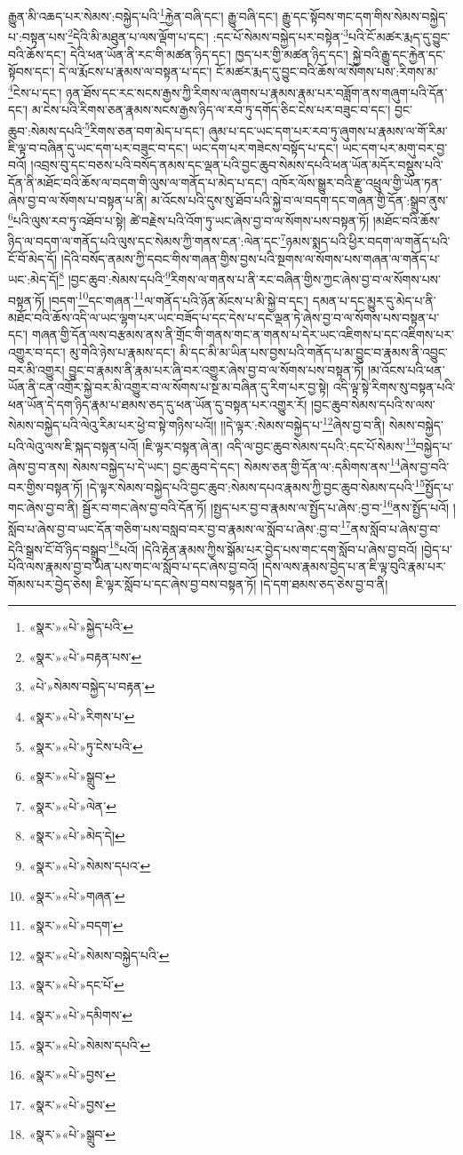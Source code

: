 རྒྱུན་མི་འཆད་པར་སེམས་:བསྐྱེད་པའི་\footnote{«སྣར་»«པེ་»སྐྱེད་པའི་}རྐྱེན་བཞི་དང་། རྒྱུ་བཞི་དང་། རྒྱུ་དང་སྟོབས་གང་དག་གིས་སེམས་བསྐྱེད་པ་:བསྟན་པས་\footnote{«སྣར་»«པེ་»བརྟན་པས་}དེའི་མི་མཐུན་པ་ལས་ལྡོག་པ་དང་། :དང་པོ་སེམས་བསྐྱེད་པར་བསྟེན་\footnote{«པེ་»སེམས་བསྐྱེད་པ་བརྟན་}པའི་ངོ་མཚར་རྨད་དུ་བྱུང་བའི་ཆོས་དང་། དེའི་ཕན་ཡོན་ནི་རང་གི་མཚན་ཉིད་དང་། ཁྱད་པར་གྱི་མཚན་ཉིད་དང་། སྐྱེ་བའི་རྒྱུ་དང་རྐྱེན་དང་སྟོབས་དང་། དེ་ལ་རྨོངས་པ་རྣམས་ལ་བསྟན་པ་དང་། ངོ་མཚར་རྨད་དུ་བྱུང་བའི་ཆོས་ལ་སོགས་པས་:རིགས་མ་\footnote{«སྣར་»«པེ་»རིགས་པ་}ངེས་པ་དང་། ཉན་ཐོས་དང་རང་སངས་རྒྱས་ཀྱི་རིགས་ལ་ཞུགས་པ་རྣམས་རྣམ་པར་བཟློག་ནས་གཞུག་པའི་དོན་དང་། མ་ངེས་པའི་རིགས་ཅན་རྣམས་སངས་རྒྱས་ཉིད་ལ་རབ་ཏུ་དགོད་ཅིང་ངེས་པར་བཟུང་བ་དང་། བྱང་ཆུབ་:སེམས་དཔའི་\footnote{«སྣར་»«པེ་»ཏུ་ངེས་པའི་}རིགས་ཅན་བག་མེད་པ་དང་། ཞུམ་པ་དང་ཡང་དག་པར་རབ་ཏུ་ཞུགས་པ་རྣམས་ལ་གོ་རིམ་ཇི་ལྟ་བ་བཞིན་དུ་ཡང་དག་པར་བཟུང་བ་དང་། ཡང་དག་པར་གཟེངས་བསྟོད་པ་དང་། ཡང་དག་པར་མགུ་བར་བྱ་བའོ། །འབྲས་བུ་དང་བཅས་པའི་བསོད་ནམས་དང་ལྡན་པའི་བྱང་ཆུབ་སེམས་དཔའི་ཕན་ཡོན་མདོར་བསྡུས་པའི་དོན་ནི་མཐོང་བའི་ཆོས་ལ་བདག་གི་ལུས་ལ་གནོད་པ་མེད་པ་དང་། འཁོར་ལོས་སྒྱུར་བའི་རྫུ་འཕྲུལ་གྱི་ཡོན་ཏན་ཞེས་བྱ་བ་ལ་སོགས་པ་བསྟན་པ་ནི། མ་འོངས་པའི་དུས་སུ་ཐོབ་པའི་སྐྱེ་བ་ལ་བདག་དང་གཞན་གྱི་དོན་:སྒྲུབ་ནུས་\footnote{«སྣར་»«པེ་»སྒྲུབ་}པའི་ལུས་རབ་ཏུ་འཐོབ་པ་སྟེ། ཚེ་བརྗེས་པའི་འོག་ཏུ་ཡང་ཞེས་བྱ་བ་ལ་སོགས་པས་བསྟན་ཏོ། །མཐོང་བའི་ཆོས་ཉིད་ལ་བདག་ལ་གནོད་པའི་ལུས་དང་སེམས་ཀྱི་གནས་ངན་:ལེན་དང་\footnote{«སྣར་»«པེ་»ལེན་}ཉམས་སྨད་པའི་ཕྱིར་བདག་ལ་གནོད་པའི་ངོ་བོ་མེད་དོ། །དེའི་བསོད་ནམས་ཀྱི་དབང་གིས་གཞན་གྱིས་བྱས་པའི་སྔགས་ལ་སོགས་པས་གཞན་ལ་གནོད་པ་ཡང་:མེད་དོ།\footnote{«སྣར་»«པེ་»མེད་དེ།} །བྱང་ཆུབ་:སེམས་དཔའི་\footnote{«སྣར་»«པེ་»སེམས་དཔའ་}རིགས་ལ་གནས་པ་ནི་རང་བཞིན་གྱིས་ཀྱང་ཞེས་བྱ་བ་ལ་སོགས་པས་བསྟན་ཏོ། །བདག་\footnote{«སྣར་»«པེ་»གཞན་}དང་གཞན་\footnote{«སྣར་»«པེ་»བདག་}ལ་གནོད་པའི་ཉོན་མོངས་པ་མི་སྐྱེ་བ་དང་། དམན་པ་དང་མྱུར་དུ་མེད་པ་ནི་མཐོང་བའི་ཆོས་འདི་ལ་ཡང་ལྷག་པར་ཡང་བཟོད་པ་དང་དེས་པ་དང་ལྡན་ཏེ་ཞེས་བྱ་བ་ལ་སོགས་པས་བསྟན་པ་དང་། གཞན་གྱི་དོན་ལས་བརྩམས་ནས་ནི་གྲོང་གི་གནས་གང་ན་གནས་པ་དེར་ཡང་འཇིགས་པ་དང་འཇིགས་པར་འགྱུར་བ་དང་། མུ་གེའི་ཉེས་པ་རྣམས་དང་། མི་དང་མི་མ་ཡིན་པས་བྱས་པའི་གནོད་པ་མ་བྱུང་བ་རྣམས་ནི་འབྱུང་བར་མི་འགྱུར། བྱུང་བ་རྣམས་ནི་རྣམ་པར་ཞི་བར་འགྱུར་ཞེས་བྱ་བ་ལ་སོགས་པས་བསྟན་ཏོ། །མ་འོངས་པའི་ཕན་ཡོན་ནི་ངན་འགྲོར་སྐྱེ་བར་མི་འགྱུར་བ་ལ་སོགས་པ་སྔ་མ་བཞིན་དུ་རིག་པར་བྱ་སྟེ། འདི་ལྟ་སྟེ་རིགས་སུ་བསྟན་པའི་ཕན་ཡོན་དེ་དག་ཉིད་རྣམ་པ་ཐམས་ཅད་དུ་ཕན་ཡོན་དུ་བསྟན་པར་འགྱུར་རོ། །བྱང་ཆུབ་སེམས་དཔའི་ས་ལས་སེམས་བསྐྱེད་པའི་ལེའུ་རིམ་པར་ཕྱེ་བ་སྟེ་གཉིས་པའོ།། །།དེ་ལྟར་:སེམས་བསྐྱེད་པ་\footnote{«སྣར་»«པེ་»སེམས་བསྐྱེད་པའི་}ཞེས་བྱ་བ་ནི། སེམས་བསྐྱེད་པའི་ལེའུ་ལས་ཇི་སྐད་བསྟན་པའོ། །ཇི་ལྟར་བསྟན་ཞེ་ན། འདི་ལ་བྱང་ཆུབ་སེམས་དཔའི་:དང་པོ་སེམས་\footnote{«སྣར་»«པེ་»དང་པོ་}བསྐྱེད་པ་ཞེས་བྱ་བ་ནས། སེམས་བསྐྱེད་པ་དེ་ཡང་། བྱང་ཆུབ་དེ་དང་། སེམས་ཅན་གྱི་དོན་ལ་:དམིགས་ནས་\footnote{«སྣར་»«པེ་»དམིགས་}ཞེས་བྱ་བའི་བར་གྱིས་བསྟན་ཏོ། །དེ་ལྟར་སེམས་བསྐྱེད་པའི་བྱང་ཆུབ་:སེམས་དཔའ་རྣམས་ཀྱི་བྱང་ཆུབ་སེམས་དཔའི་\footnote{«སྣར་»«པེ་»སེམས་དཔའི་}སྤྱོད་པ་གང་ཞེས་བྱ་བ་ནི། སྦྱོར་བ་གང་ཞེས་བྱ་བའི་དོན་ཏོ། །སྤྱད་པར་བྱ་བ་རྣམས་ལ་སྤྱོད་པ་ཞེས་:བྱ་བ་\footnote{«སྣར་»«པེ་»བྱས་}ནས་སྤྱོད་པའོ། །སློབ་པ་ཞེས་བྱ་བ་ཡང་དོན་གཅིག་པས་བསླབ་བར་བྱ་བ་རྣམས་ལ་སློབ་པ་ཞེས་:བྱ་བ་\footnote{«སྣར་»«པེ་»བྱས་}ནས་སློབ་པ་ཞེས་བྱ་བ་དེའི་སྒྲས་ངོ་བོ་ཉིད་བསྒྲུབ་\footnote{«སྣར་»«པེ་»སྒྲུབ་}པའོ། །དེའི་རྟེན་རྣམས་ཀྱིས་སྒོམ་པར་བྱེད་པས་གང་དག་སློབ་པ་ཞེས་བྱ་བའོ། །བྱེད་པ་པོའི་ལས་རྣམས་བྱ་བ་ཡིན་པས་གང་ལ་སློབ་པ་དང་ཞེས་བྱ་བའོ། །དེས་ལས་རྣམས་བྱེད་པ་ན་ཇི་ལྟ་བུའི་རྣམ་པར་གོམས་པར་བྱེད་ཅེས། ཇི་ལྟར་སློབ་པ་དང་ཞེས་བྱ་བས་བསྟན་ཏོ། །དེ་དག་ཐམས་ཅད་ཅེས་བྱ་བ་ནི། 